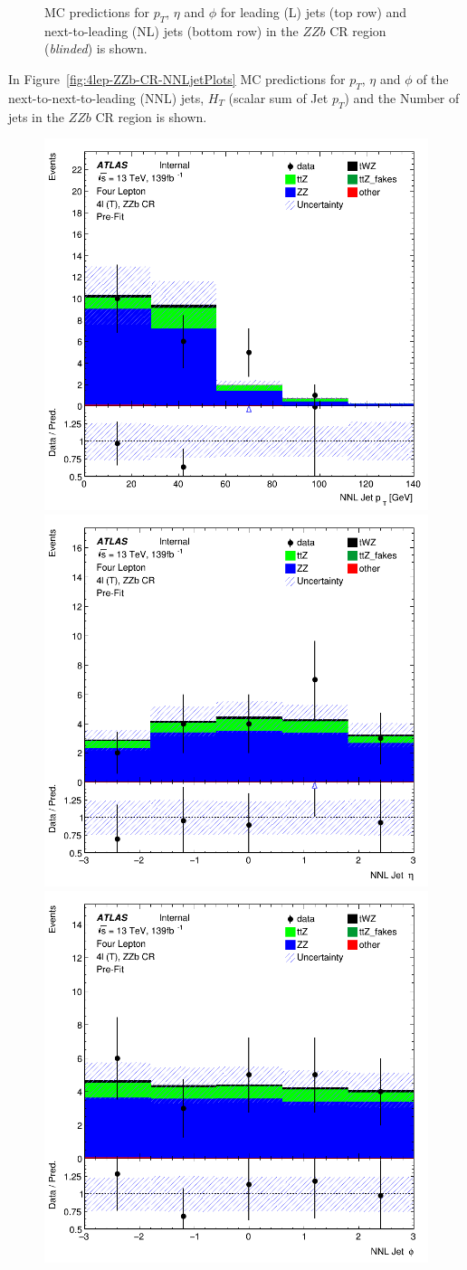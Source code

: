 \begin{figure}[htbp]
\begin{tabular}{ccc}
  \end{tabular}
    \caption{MC predictions for $p_{T}$, $\eta$ and $\phi$ for leading (L) jets (top row) and next-to-leading (NL) jets (bottom row) in the $ZZb$ CR region (\textit{blinded}) is shown.}
    \label{fig:4lep-ZZb-CR-LandNjetPlots} 
\end{figure}

In Figure~\ref{fig:4lep-ZZb-CR-NNLjetPlots} MC predictions for $p_{T}$, $\eta$ and $\phi$ of the next-to-next-to-leading (NNL) jets, $H_{T}$ (scalar sum of Jet $p_{T}$) and the Number of jets in the $ZZb$ CR region is shown.


\begin{figure}[htbp]
 \centering


    \includegraphics[width=.3\textwidth]{figures/PreFitPlots/lep4_ZZb_4T_NNLJet_pt.png} \quad
    \includegraphics[width=.3\textwidth]{figures/PreFitPlots/lep4_ZZb_4T_NNLJet_eta.png} \quad
    \includegraphics[width=.3\textwidth]{figures/PreFitPlots/lep4_ZZb_4T_NNLJet_phi.png}

    \medskip


\end{figure}
